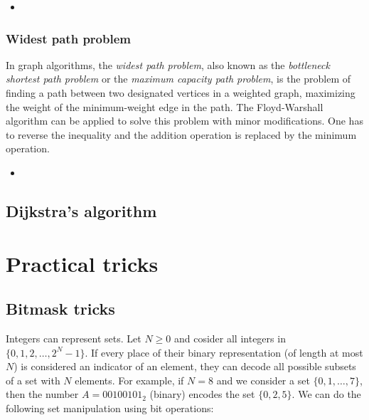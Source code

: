 \documentclass[a4paper, twoside,openany]{book}
\newcounter{problem}\setcounter{problem}{0}
\newcommand{\insertcode}[2]{\begin{itemize}\item[]\end{itemize}} %
\begin{document}
\insertcode{"codes/floyd_warshall_reconstruct.cpp"}{A C++ code for the Floyd-Warshall algorithm with information about the minimal path.} 

\subsection{Widest path problem}
In graph algorithms, the \emph{widest path problem}, also known as the \emph{bottleneck shortest path problem} or the \emph{maximum capacity path problem}, is the problem of finding a path between two designated vertices in a weighted graph, maximizing the weight of the minimum-weight edge in the path.
The Floyd-Warshall algorithm can be applied to solve this problem with minor modifications.
One has to reverse the inequality and the addition operation is replaced by the minimum operation.

\insertcode{"codes/floyd_warshall_routing.cpp"}{A C++ code for the Floyd-Warshall algorithm used for optimal routing in a constrained network.} 


\section{Dijkstra's algorithm}
\label{Dijkstra}

\chapter{Practical tricks}

\section{Bitmask tricks}
\label{bitmask}

Integers can represent sets. Let $N \geq 0$ and cosider all integers in $\{ 0, 1, 2, \ldots, 2^N-1 \}$. If every place of their binary representation (of length at most $N$) is considered an indicator of an element, they can decode all possible subsets of a set with $N$ elements. For example, if $N=8$ and we consider a set $\{ 0, 1, \ldots, 7\}$, then the number $A=00100101_2$ (binary) encodes the set $\{ 0, 2, 5 \}$. We can do the following set manipulation using bit operations:
\end{document}
